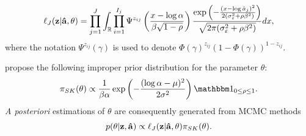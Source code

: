     \begin{equation}
    \label{eq:SKr:likelihood-theta}
        \ell_J(\mbf z | \mbf{\hat a}, \theta)
            = \prod_{j=1}^J  \int_\RR\prod_{i=1}^{I_j} %
            \Psi^{z_{ij}}\left(\frac{x-\log\alpha}{\beta\sqrt{1-\rho}}\right)
                \frac{\exp\left({-\frac{(x-\log\hat{a}_{j})^2}{2(\sigma^2_\eps+\rho\beta^2)}}\right)}{\sqrt{2\pi(\sigma_\eps^2+\rho\beta^2)}}dx ,%
    \end{equation}
    where the notation $\Psi^{z_{ij}}(\gamma)$ is used to denote $\Phi(\gamma)^{z_{ij}}(1-\Phi(\gamma))^{1-z_{ij}}$.

    \citet{straub_improved_2008} propose the following improper prior distribution for the parameter $\theta$:
    \begin{equation}\label{eq:SKr:SKprior}
        \pi_{SK}(\theta) \propto \frac{1}{\beta\alpha}\exp\left(-\frac{(\log\alpha-\mu)^2}{2\sigma^2}\right)\indic_{0\leq\rho\leq1}.
    \end{equation}
    \emph{A posteriori} estimations of $\theta$ are consequently generated from MCMC methods %
    \begin{equation}\label{eq:SKr:post}
        p(\theta|\mathbf{z},\mathbf{\hat a})\propto \ell_J(\mathbf{z} | \mathbf{\hat a}, \theta)\pi_{SK}(\theta).
    \end{equation}
        
        
